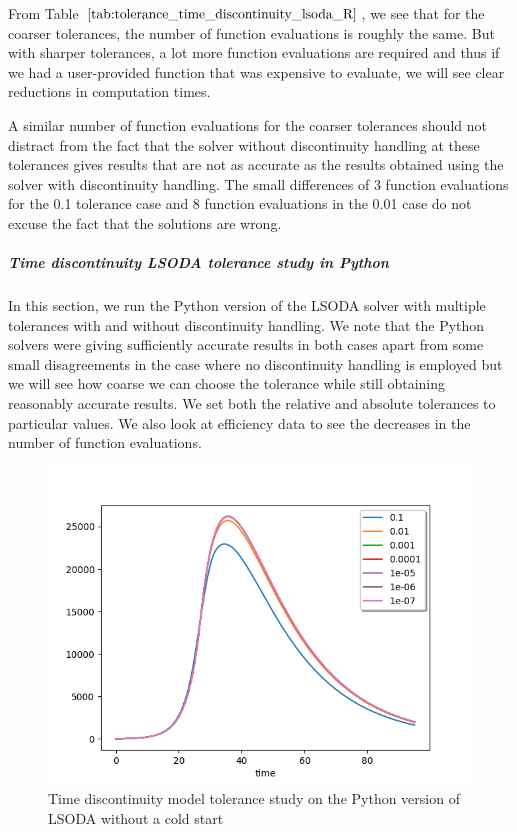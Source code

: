 From Table $\ref{tab:tolerance_time_discontinuity_lsoda_R}$, we see that for the coarser tolerances, the number of function evaluations is roughly the same. But with sharper tolerances, a lot more function evaluations are required and thus if we had a user-provided function that was expensive to evaluate, we will see clear reductions in computation times.

A similar number of function evaluations for the coarser tolerances should not distract from the fact that the solver without discontinuity handling at these tolerances gives results that are not as accurate as the results obtained using the solver with discontinuity handling. The small differences of 3 function evaluations for the 0.1 tolerance case and 8 function evaluations in the 0.01 case do not excuse the fact that the solutions are wrong.

\subparagraph{Time discontinuity LSODA tolerance study in Python}
In this section, we run the Python version of the LSODA solver with multiple tolerances with and without discontinuity handling. We note that the Python solvers were giving sufficiently accurate results in both cases apart from some small disagreements in the case where no discontinuity handling is employed but we will see how coarse we can choose the tolerance while still obtaining reasonably accurate results. We set both the relative and absolute tolerances to particular values. We also look at efficiency data to see the decreases in the number of function evaluations.

\begin{figure}[h]
\centering
\includegraphics[width=0.7\linewidth]{./figures/tolerance_time_lsoda_no_event_py}
\caption{Time discontinuity model tolerance study on the Python version of LSODA without a cold start}
\label{fig:tolerance_time_lsoda_no_event_py}
\end{figure}


